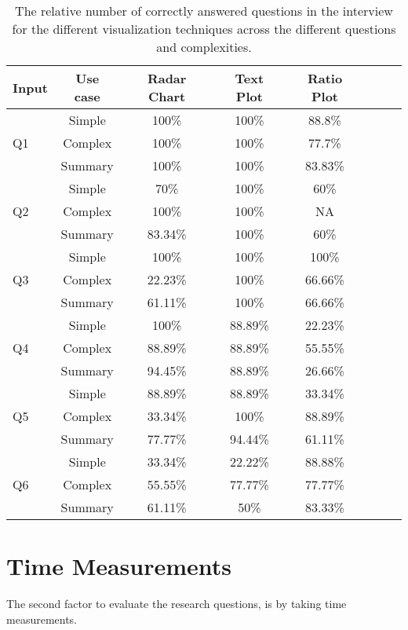 \begin{table}[!htbp]
\centering
\small
\begin{tabular}{lccccccc}
\toprule   
 Input & Use case & Radar Chart  & Text Plot  & Ratio Plot \\ 
\midrule
& Simple & 100\% &  100\% & 88.8\%\\ 
Q1  & Complex &  100\% &  100\% &  77.7\%\\ 
\midrule
& Summary &  100\% &  100\% &  83.83\%\\
\bottomrule
& Simple & 70\% &  100\% & 60\%\\ 
Q2 & Complex & 100\% & 100\% & NA\\ 
\midrule
& Summary & 83.34\% & 100\% &  60\%\\
\bottomrule
& Simple & 100\% &  100\% & 100\%\\ 
Q3 & Complex & 22.23\% & 100\% & 66.66\%\\ 
\midrule
& Summary & 61.11\% & 100\% &  66.66\%\\
\bottomrule
& Simple & 100\% &  88.89\% & 22.23\%\\ 
Q4 & Complex & 88.89\% & 88.89\% & 55.55\%\\ 
\midrule
& Summary & 94.45\% & 88.89\% &  26.66\%\\
\bottomrule
& Simple &  88.89\% &  88.89\% & 33.34\%\\ 
Q5 & Complex & 33.34\% & 100\% &  88.89\%\\ 
\midrule
& Summary & 77.77\% & 94.44\% &  61.11\%\\
\bottomrule
& Simple &  33.34\% &  22.22\% & 88.88\%\\ 
Q6 & Complex & 55.55\% & 77.77\% &  77.77\%\\ 
\midrule
& Summary & 61.11\% & 50\% & 83.33\%\\
\bottomrule
\end{tabular}
\label{table:correctness}
\caption[Correctness Table]{The relative number of correctly answered questions in the interview for the different visualization techniques
across the different questions and complexities.} 
\end{table}
 
\section{Time Measurements}
\label{sec:4.2}
The second factor to evaluate the research questions, is by taking time measurements.

